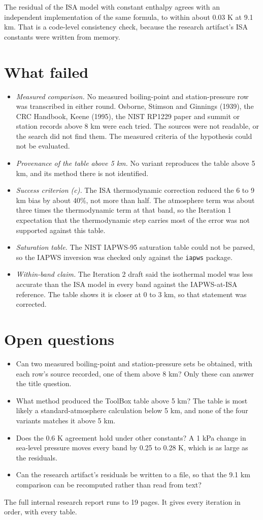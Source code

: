 \documentclass[11pt,letterpaper]{article}
\begin{document}
The residual of the ISA model with constant enthalpy agrees with an independent implementation of the same formula, to within about 0.03 K at 9.1 km. That is a code-level consistency check, because the research artifact's ISA constants were written from memory.

\section{What failed}

\begin{itemize}
\item \emph{Measured comparison.} No measured boiling-point and station-pressure row was transcribed in either round. Osborne, Stimson and Ginnings (1939), the CRC Handbook, Keene (1995), the NIST RP1229 paper and summit or station records above 8 km were each tried. The sources were not readable, or the search did not find them. The measured criteria of the hypothesis could not be evaluated.
\item \emph{Provenance of the table above 5 km.} No variant reproduces the table above 5 km, and its method there is not identified.
\item \emph{Success criterion (c).} The ISA thermodynamic correction reduced the 6 to 9 km bias by about 40\%, not more than half. The atmosphere term was about three times the thermodynamic term at that band, so the Iteration 1 expectation that the thermodynamic step carries most of the error was not supported against this table.
\item \emph{Saturation table.} The NIST IAPWS-95 saturation table could not be parsed, so the IAPWS inversion was checked only against the \texttt{iapws} package.
\item \emph{Within-band claim.} The Iteration 2 draft said the isothermal model was less accurate than the ISA model in every band against the IAPWS-at-ISA reference. The table shows it is closer at 0 to 3 km, so that statement was corrected.
\end{itemize}

\section{Open questions}

\begin{itemize}
\item Can two measured boiling-point and station-pressure sets be obtained, with each row's source recorded, one of them above 8 km? Only these can answer the title question.
\item What method produced the ToolBox table above 5 km? The table is most likely a standard-atmosphere calculation below 5 km, and none of the four variants matches it above 5 km.
\item Does the 0.6 K agreement hold under other constants? A 1 kPa change in sea-level pressure moves every band by 0.25 to 0.28 K, which is as large as the residuals.
\item Can the research artifact's residuals be written to a file, so that the 9.1 km comparison can be recomputed rather than read from text?
\end{itemize}

The full internal research report runs to 19 pages. It gives every iteration in order, with every table.
\end{document}
